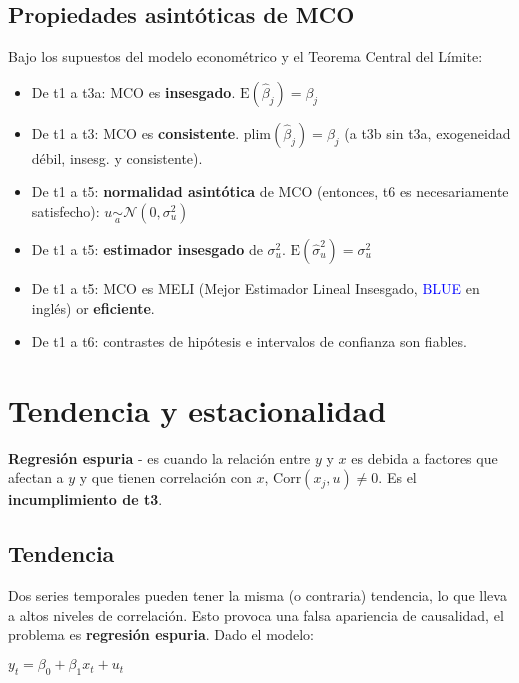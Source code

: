 \documentclass[10pt, a4paper, landscape]{article}
\newcommand{\E}{\mathrm{E}}
\newcommand{\Corr}{\mathrm{Corr}}
\begin{document}
\begin{multicols}{3}
		\subsection*{Propiedades asintóticas de MCO}
		
		Bajo los supuestos del modelo econométrico y el Teorema Central del Límite:
		
		\begin{itemize}[leftmargin=*]
			\item De t1 a t3a: MCO es \textbf{insesgado}. $\E(\hat{\beta}_{j}) = \beta_{j}$
			\item De t1 a t3: MCO es \textbf{consistente}. $\mathrm{plim}(\hat{\beta}_{j}) = \beta_{j}$ (a t3b sin t3a, exogeneidad débil, insesg. y consistente).
			\item De t1 a t5: \textbf{normalidad asintótica} de MCO (entonces, t6 es necesariamente satisfecho): $u \underset{a}{\sim}\mathcal{N}(0, \sigma^{2}_{u})$
			\item De t1 a t5: \textbf{estimador insesgado} de $\sigma^{2}_{u}$. $\E(\hat{\sigma}^{2}_{u}) = \sigma^{2}_{u}$
			\item De t1 a t5: MCO es MELI (Mejor Estimador Lineal Insesgado, \textcolor{blue}{BLUE} en inglés) or \textbf{eficiente}.
			\item De t1 a t6: contrastes de hipótesis e intervalos de confianza son fiables.
		\end{itemize}
		
		\columnbreak
		
		\section*{Tendencia y estacionalidad}
		
		\textbf{Regresión espuria} - es cuando la relación entre $y$ y $x$ es debida a factores que afectan a $y$ y que tienen correlación con $x$, $\Corr(x_{j}, u) \neq 0$. Es el \textbf{incumplimiento de t3}.
		
		\subsection*{Tendencia}
		
		Dos series temporales pueden tener la misma (o contraria) tendencia, lo que lleva a altos niveles de correlación. Esto provoca una falsa apariencia de causalidad, el problema es \textbf{regresión espuria}. Dado el modelo:
		
		\begin{center}
			$y_{t} = \beta_{0} + \beta_{1} x_{t} + u_{t}$
		\end{center}
		

\end{multicols}
\end{document}
